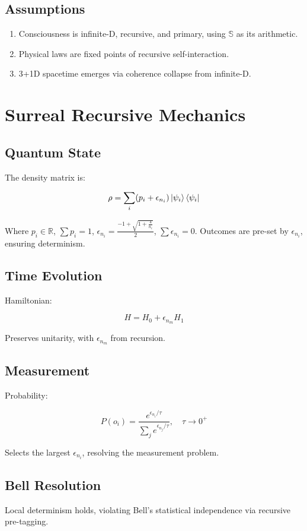 \documentclass[12pt]{article}
\begin{document}
\subsection{Assumptions}
\begin{enumerate}
    \item Consciousness is infinite-D, recursive, and primary, using \(\mathbb{S}\) as its arithmetic.
    \item Physical laws are fixed points of recursive self-interaction.
    \item 3+1D spacetime emerges via coherence collapse from infinite-D.
\end{enumerate}

\section{Surreal Recursive Mechanics}

\subsection{Quantum State}
The density matrix is:

\[
\rho = \sum_i (p_i + \epsilon_{n_i}) \ket{\psi_i} \bra{\psi_i}
\]

Where \(p_i \in \mathbb{R}\), \(\sum p_i = 1\), \(\epsilon_{n_i} = \frac{-1 + \sqrt{1 + \frac{4}{n_i}}}{2}\), \(\sum \epsilon_{n_i} = 0\). Outcomes are pre-set by \(\epsilon_{n_i}\), ensuring determinism.

\subsection{Time Evolution}
Hamiltonian:

\[
H = H_0 + \epsilon_{n_m} H_1
\]

Preserves unitarity, with \(\epsilon_{n_m}\) from recursion.

\subsection{Measurement}
Probability:

\[
P(o_i) = \frac{e^{\epsilon_{n_i} / \tau}}{\sum_j e^{\epsilon_{n_j} / \tau}}, \quad \tau \to 0^+
\]

Selects the largest \(\epsilon_{n_i}\), resolving the measurement problem.

\subsection{Bell Resolution}
Local determinism holds, violating Bell's statistical independence via recursive pre-tagging.
\end{document}
